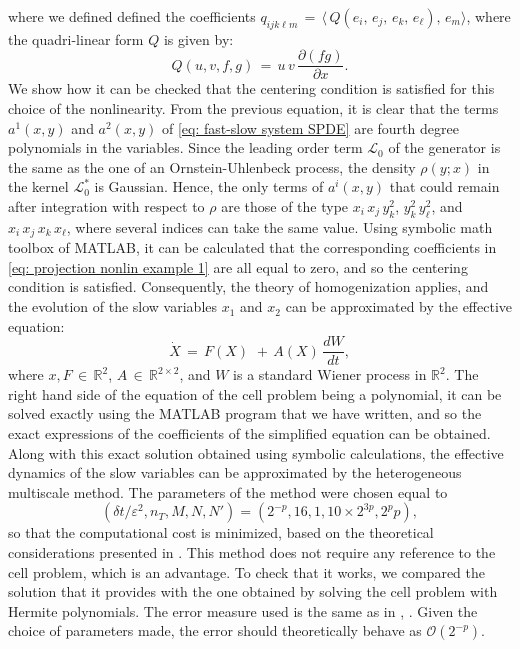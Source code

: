 where we defined defined the coefficients $q_{ijk{\ell}m} \,=\, \langle\, Q(e_i,\,e_j,\,e_k,\,e_{\ell}),\,e_m \rangle$, where the quadri-linear form $Q$ is given by:
\begin{equation*}
    Q(u,v,f,g) \,=\, u \, v \, \frac{{\partial}(fg)}{{\partial}x}. 
\end{equation*}
We show how it can be checked that the centering condition is satisfied for this choice of the nonlinearity. From the previous equation, it is clear that the terms $a^1(x,y)$ and $a^2(x,y)$ of \eqref{eq: fast-slow system SPDE} are fourth degree polynomials in the variables. Since the leading order term $\mathcal L_0$ of the generator is the same as the one of an Ornstein-Uhlenbeck process, the density ${\rho}(y;x)$ in the kernel $\mathcal L_0^*$ is Gaussian. Hence, the only terms of $a^i(x,y)$ that could remain after integration with respect to ${\rho}$ are those of the type $x_i\,x_j\, y_k^2$, $y_k^2\,y_{\ell}^2$, and $x_i\,x_j\,x_k\,x_{\ell}$, where several indices can take the same value. Using symbolic math toolbox of MATLAB, it can be calculated that the corresponding coefficients in \eqref{eq: projection nonlin example 1} are all equal to zero, and so the centering condition is satisfied. Consequently, the theory of homogenization applies, and the evolution of the slow variables $x_1$ and $x_2$ can be approximated by the effective equation:
\begin{equation}
    \dot X \,=\, F(X) \, \,+\, A(X) \, \frac{dW}{dt},
\end{equation}
where $x,F\,{\in}\,\mathbb R^2$, $A \,{\in}\,\mathbb R^{2{\times}2}$, and $W$ is a standard Wiener process in $\mathbb R^2$. The right hand side of the equation of the cell problem being a polynomial, it can be solved exactly using the MATLAB program that we have written, and so the exact expressions of the coefficients of the simplified equation can be obtained. Along with this exact solution obtained using symbolic calculations, the effective dynamics of the slow variables can be approximated by the heterogeneous multiscale method. The parameters of the method were chosen equal to $$ ({\delta}t/{\varepsilon}^2, n_T, M,N, N') = ( 2^{-p}, 16, 1 , 10{\times}2^{3p}, 2^pp),$$ so that the computational cost is minimized, based on the theoretical considerations presented in \cite{weinan2005analysis}. This method does not require any reference to the cell problem, which is an advantage. To check that it works, we compared the solution that it provides with the one obtained by solving the cell problem with Hermite polynomials. The error measure used is the same as in \cite{weinan2005analysis}, . Given the choice of parameters made, the error should theoretically behave as $\mathcal O(2^{- p })$. 

